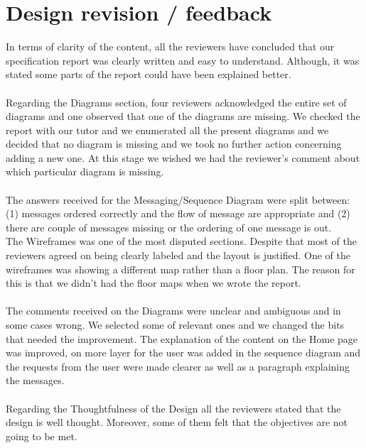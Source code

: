 \documentclass{sig-alt-release2}
\begin{document}

\section{Design revision / feedback}

In terms of clarity of the content, all the reviewers have concluded that our 
specification report was clearly written and easy to understand. Although, it 
was stated some parts of the report could have been explained better.\\
\\
Regarding the Diagrams section, four reviewers acknowledged the entire set of 
diagrams and one observed that one of the diagrams are missing.  We checked the 
report with our tutor and we enumerated all the present diagrams and we decided 
that no diagram is missing and we took no further action concerning adding a new 
one. At this stage we wished we had the reviewer's comment about which particular 
diagram is missing.\\
\\
The answers received for the Messaging/Sequence Diagram were split between: (1) 
messages ordered correctly and the flow of message are appropriate and (2) there 
are couple of messages missing or the ordering of one message is out. \\
The Wireframes was one of the most disputed sections. Despite that most of the 
reviewers agreed on being clearly labeled and the layout is justified. One of 
the wireframes was showing a different map rather than  a floor plan. The 
reason for this is that we didn't had the floor maps when we wrote the report.\\
\\
The comments received on the Diagrams were unclear and ambiguous and in some cases 
wrong. We selected some of relevant ones and we changed the bits that needed the 
improvement. The explanation of the content on the Home page was improved, on more 
layer for the user was added in the sequence diagram and the requests from the 
user were made clearer as well as a paragraph explaining the messages.\\
\\
Regarding the Thoughtfulness of the Design all the reviewers stated that 
the design is well thought. Moreover, some of them felt that the objectives 
are not going to be met.\\
\\
\end{document}
